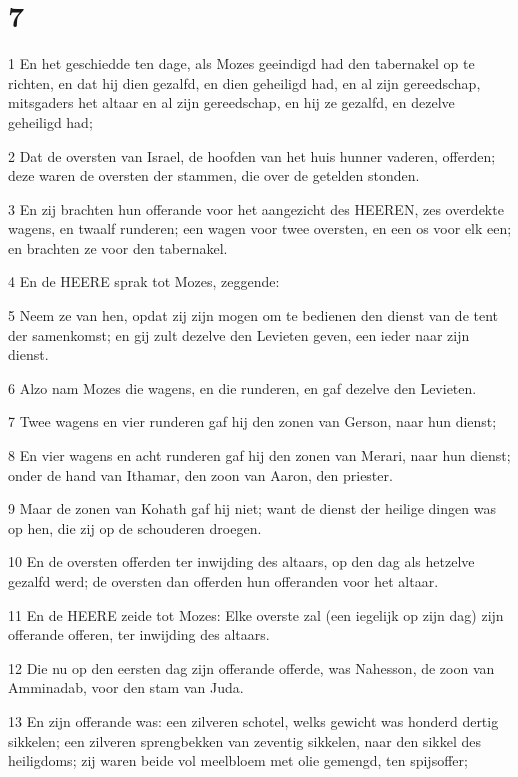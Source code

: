 \chapter{7}

\par 1 En het geschiedde ten dage, als Mozes geeindigd had den tabernakel op te richten, en dat hij dien gezalfd, en dien geheiligd had, en al zijn gereedschap, mitsgaders het altaar en al zijn gereedschap, en hij ze gezalfd, en dezelve geheiligd had;
\par 2 Dat de oversten van Israel, de hoofden van het huis hunner vaderen, offerden; deze waren de oversten der stammen, die over de getelden stonden.
\par 3 En zij brachten hun offerande voor het aangezicht des HEEREN, zes overdekte wagens, en twaalf runderen; een wagen voor twee oversten, en een os voor elk een; en brachten ze voor den tabernakel.
\par 4 En de HEERE sprak tot Mozes, zeggende:
\par 5 Neem ze van hen, opdat zij zijn mogen om te bedienen den dienst van de tent der samenkomst; en gij zult dezelve den Levieten geven, een ieder naar zijn dienst.
\par 6 Alzo nam Mozes die wagens, en die runderen, en gaf dezelve den Levieten.
\par 7 Twee wagens en vier runderen gaf hij den zonen van Gerson, naar hun dienst;
\par 8 En vier wagens en acht runderen gaf hij den zonen van Merari, naar hun dienst; onder de hand van Ithamar, den zoon van Aaron, den priester.
\par 9 Maar de zonen van Kohath gaf hij niet; want de dienst der heilige dingen was op hen, die zij op de schouderen droegen.
\par 10 En de oversten offerden ter inwijding des altaars, op den dag als hetzelve gezalfd werd; de oversten dan offerden hun offeranden voor het altaar.
\par 11 En de HEERE zeide tot Mozes: Elke overste zal (een iegelijk op zijn dag) zijn offerande offeren, ter inwijding des altaars.
\par 12 Die nu op den eersten dag zijn offerande offerde, was Nahesson, de zoon van Amminadab, voor den stam van Juda.
\par 13 En zijn offerande was: een zilveren schotel, welks gewicht was honderd dertig sikkelen; een zilveren sprengbekken van zeventig sikkelen, naar den sikkel des heiligdoms; zij waren beide vol meelbloem met olie gemengd, ten spijsoffer;
